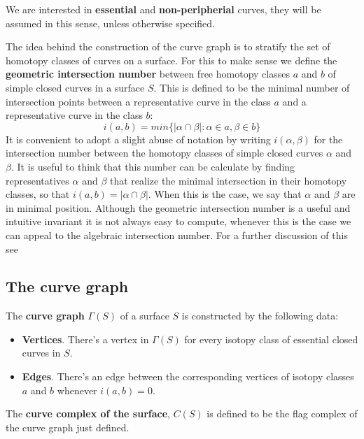 We are interested in \textbf{essential} and \textbf{non-peripherial} curves, they will be assumed in this sense, unless otherwise specified.

The idea behind the construction of the curve graph is to stratify the set of homotopy classes of curves on a surface. For this to make sense we define the \textbf{geometric intersection number} between free homotopy classes $a$ and $b$ of simple closed curves in a surface $S$. This is defined to be the minimal number of intersection points between a representative curve in the class $a$ and a representative curve in the class $b$:
$$i(a,b) = min \{ |\alpha \cap \beta| : \alpha \in a, \beta \in b \}$$
It is convenient to adopt a slight abuse of notation by writing $i(\alpha, \beta)$ for the intersection number between the homotopy classes of simple closed curves $\alpha$ and $\beta$. It is useful to think that this number can be calculate by finding representatives $\alpha$ and $\beta$ that realize the minimal intersection in their homotopy classes, so that $i(a, b) = |\alpha \cap \beta|$. When this is the case, we say that $\alpha$ and $\beta$ are in minimal position. Although the geometric intersection number is a useful and intuitive invariant it is not always easy to compute, whenever this is the case we can appeal to the algebraic intersection number. For a further discussion of this see \cite[Farb]{Farb}

\subsection{The curve graph}

\begin{defini}
The \textbf{curve graph} $\Gamma(S)$ of a surface $S$ is constructed by the following data:
\begin{itemize}
\item \textbf{Vertices}. There's a vertex in $\Gamma(S)$ for every isotopy class of essential closed curves in $S$.
\item \textbf{Edges}. There's an edge between the corresponding vertices of isotopy classes $a$ and $b$ whenever $i(a,b)=0$.
\end{itemize}
\end{defini}

\begin{defini}
The \textbf{curve complex of the surface}, $C(S)$ is defined to be the flag complex of the curve graph just defined.
\end{defini}

